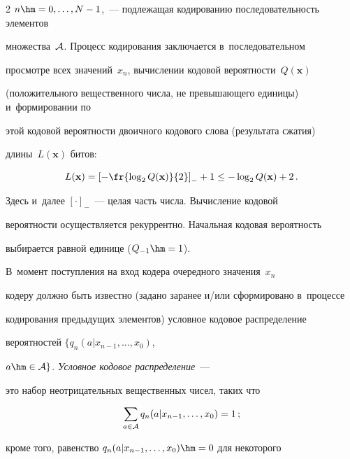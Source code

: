 \begin{multicols}{2}
$n\hm=0,\ldots,N-1$,~--- подлежащая кодированию последовательность элементов 

множества~${\cal A}$. Процесс кодирования заключается в~последовательном 

просмотре всех значений~$x_n$, вычислении кодовой вероятности~$Q(\mathbf{x})$ 

(положительного вещественного числа, не превышающего единицы) и~формировании по 

этой кодовой вероятности двоичного кодового слова (результата сжатия) 

длины~$L(\mathbf{x})$ битов:

\begin{equation}

\label{eq1}

L(\mathbf{x}) = \left[-\fr{\log_{2}Q(\mathbf{x})}{2}\right]_{-}+1 \leq 

-\log_{2}Q(\mathbf{x})+2\,.

\end{equation}



\columnbreak



\noindent

Здесь и~далее $[\cdot]_{-}$~--- целая часть числа. Вычисление кодовой 

вероятности осуществляется рекуррентно. Начальная кодовая вероятность 

выбирается равной единице  ($Q_{-1}\hm=1$). 

В~момент поступления на вход кодера очередного значения~$x_n$ 

кодеру долж\-но быть известно (задано заранее и/или сфор\-мировано в~процессе 

кодирования предыдущих элементов) условное кодовое распределение 

вероятностей  $\{q_n(a|x_{n-1},\ldots,x_0)$, 

$a\hm\in{\cal A}\}$. {\it Условное кодовое распределение}~--- 

это набор неотрицательных вещественных чисел, таких что

\begin{equation}

\label{eq2}

\sum_{a\in{\cal A}}q_n(a|x_{n-1},\dots,x_0) = 1\,;

\end{equation}

кроме того, равенство $q_n(a|x_{n-1},\dots,x_0)\hm=0$ для некоторого


\end{multicols}
